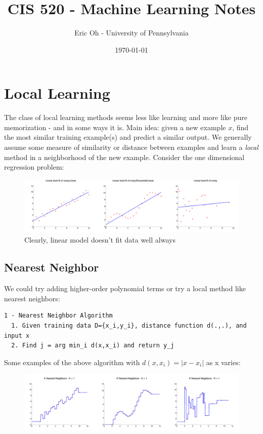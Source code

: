 \documentclass[a4paper]{article}\usepackage[]{graphicx}\usepackage[]{color}
\title{CIS 520 - Machine Learning Notes}
\author{Eric Oh - University of Pennsylvania}
\date{\today}
\begin{document}
\maketitle

\section{Local Learning}

The class of local learning methods seems less like learning and more like pure memorization - and in some ways it is. Main idea: given a new example $x$, find the most similar training example(s) and predict a similar output. We generally assume some measure of similarity or distance between examples and learn a \emph{local} method in a neighborhood of the new example. Consider the one dimensional regression problem:

\begin{figure}[H]
\centering
\includegraphics[width=6in]{badlinreg.png}
\caption{Clearly, linear model doesn't fit data well always}
\end{figure}

\subsection{Nearest Neighbor}

We could try adding higher-order polynomial terms or try a local method like nearest neighbors:

\begin{verbatim}
1 - Nearest Neighbor Algorithm 
  1. Given training data D={x_i,y_i}, distance function d(.,.), and input x
  2. Find j = arg min_i d(x,x_i) and return y_j
\end{verbatim}

Some examples of the above algorithm with $d(x,x_i)=|x-x_i|$ as x varies:

\begin{figure}[H]
\centering
\includegraphics[width=6in]{1NN.png}
\end{figure}
\end{document}
